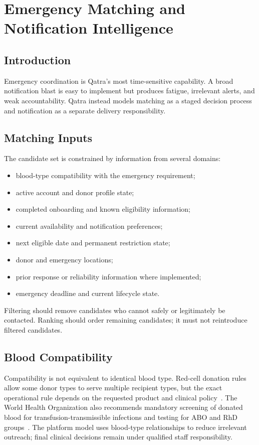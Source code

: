 \chapter{Emergency Matching and Notification Intelligence}

\section*{Introduction}
Emergency coordination is Qatra's most time-sensitive capability. A broad notification blast is easy to implement but produces fatigue, irrelevant alerts, and weak accountability. Qatra instead models matching as a staged decision process and notification as a separate delivery responsibility.

\section{Matching Inputs}
The candidate set is constrained by information from several domains:

\begin{itemize}
  \item blood-type compatibility with the emergency requirement;
  \item active account and donor profile state;
  \item completed onboarding and known eligibility information;
  \item current availability and notification preferences;
  \item next eligible date and permanent restriction state;
  \item donor and emergency locations;
  \item prior response or reliability information where implemented;
  \item emergency deadline and current lifecycle state.
\end{itemize}

Filtering should remove candidates who cannot safely or legitimately be contacted. Ranking should order remaining candidates; it must not reintroduce filtered candidates.

\section{Blood Compatibility}
Compatibility is not equivalent to identical blood type. Red-cell donation rules allow some donor types to serve multiple recipient types, but the exact operational rule depends on the requested product and clinical policy~\cite{redcrossCompatibility}. The World Health Organization also recommends mandatory screening of donated blood for transfusion-transmissible infections and testing for ABO and RhD groups~\cite{whoDonationTesting}. The platform model uses blood-type relationships to reduce irrelevant outreach; final clinical decisions remain under qualified staff responsibility.


